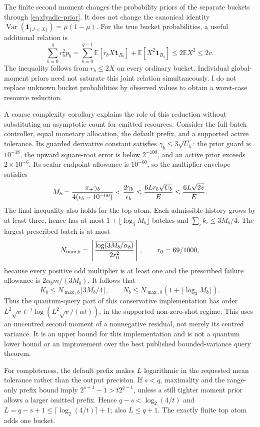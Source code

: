 The finite second moment changes the probability priors of the separate buckets through \eqref{eq:dyadic-prior}. It does not change the canonical identity
\(\operatorname{Var}(\mathbf1_{\{J<X\}})=\mu(1-\mu)\). For the true bucket probabilities, a useful additional relation is
\[
 \sum_{b=0}^q r_b^2p_b
 =\sum_{b=0}^{q-1}\mathbb E[r_bX\mathbf1_{B_b}]
   +\mathbb E[X^2\mathbf1_{B_q}]
 \leq2\mathbb E X^2\leq2v.
 \tag{D7}\label{eq:dyadic-joint-moment}
\]
The inequality follows from \(r_b\leq2X\) on every ordinary bucket. Individual global-moment priors need not saturate this joint relation simultaneously. I do not replace unknown bucket probabilities by observed values to obtain a worst-case resource reduction.

A coarse complexity corollary explains the role of this reduction without substituting an asymptotic count for emitted resources. Consider the full-batch controller, equal monetary allocation, the default prefix, and a supported active tolerance. Its guarded derivative constant satisfies \(\gamma_b\leq3\sqrt{U_b}\): the prior guard is \(10^{-18}\), the upward square-root error is below \(2^{-100}\), and an active prior exceeds \(2\times10^{-6}\). Its scalar endpoint allowance is \(10^{-60}\), so the multiplier envelope satisfies
\[
 M_b={\pi_+\gamma_b\over4(\epsilon_b-10^{-60})}
 <{2\gamma_b\over\epsilon_b}
 \leq {6Lr_b\sqrt{U_b}\over E}
 \leq {6L\sqrt{2v}\over E}.
\]
The final inequality also holds for the top atom. Each admissible history grows by at least three, hence has at most
\(1+\lfloor\log_3 M_b\rfloor\) batches and
\(\sum_i k_i\leq3M_b/4\). The largest prescribed batch is at most
\[
 N_{\max,b}=
 \left\lceil{\overline{\log(3M_b/\alpha_b)}\over2r_0^2}\right\rceil,
 \qquad r_0=69/1000,
\]
because every positive odd multiplier is at least one and the prescribed failure allowance is \(2\alpha_bm/(3M_b)\). It follows that
\[
 K_b\leq N_{\max,b}\lfloor3M_b/4\rfloor,
 \qquad N_b\leq N_{\max,b}(1+\lfloor\log_3M_b\rfloor).
\]
Thus the quantum-query part of this conservative implementation has order
\(L^2\sqrt v\,t^{-1}\log(L^2\sqrt v/(\alpha t))\), in the supported non-zero-shot regime. This uses an uncentred second moment of a nonnegative residual, not merely its centred variance. It is an upper bound for this implementation and is not a quantum lower bound or an improvement over the best published bounded-variance query theorem.

For completeness, the default prefix makes \(L\) logarithmic in the requested mean tolerance rather than the output precision. If \(s<q\), maximality and the range-only prefix bound imply
\(2^{s+1}-1>t2^{q-1}\), unless a still tighter moment prior allows a larger omitted prefix. Hence \(q-s<\log_2(4/t)\) and
\(L=q-s+1\leq\lceil\log_2(4/t)\rceil+1\); also \(L\leq q+1\). The exactly finite top atom adds one bucket.


